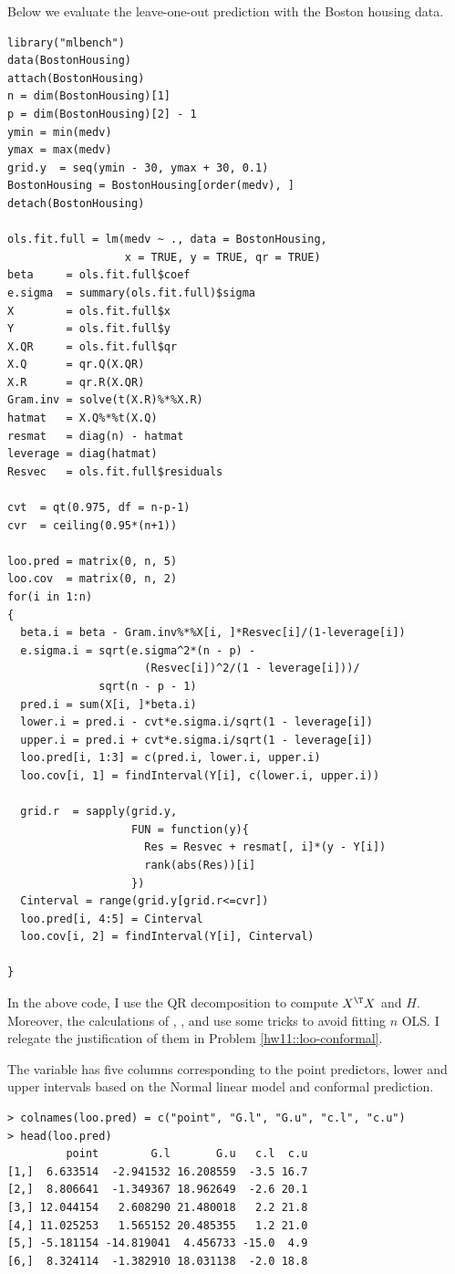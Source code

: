 Below we evaluate the leave-one-out prediction with the Boston housing data. 
\begin{lstlisting}
library("mlbench")
data(BostonHousing)
attach(BostonHousing)
n = dim(BostonHousing)[1]
p = dim(BostonHousing)[2] - 1
ymin = min(medv)
ymax = max(medv)
grid.y  = seq(ymin - 30, ymax + 30, 0.1)
BostonHousing = BostonHousing[order(medv), ]
detach(BostonHousing)

ols.fit.full = lm(medv ~ ., data = BostonHousing,
                  x = TRUE, y = TRUE, qr = TRUE)
beta     = ols.fit.full$coef
e.sigma  = summary(ols.fit.full)$sigma
X        = ols.fit.full$x
Y        = ols.fit.full$y
X.QR     = ols.fit.full$qr
X.Q      = qr.Q(X.QR)
X.R      = qr.R(X.QR)
Gram.inv = solve(t(X.R)%*%X.R)
hatmat   = X.Q%*%t(X.Q) 
resmat   = diag(n) - hatmat
leverage = diag(hatmat)
Resvec   = ols.fit.full$residuals

cvt  = qt(0.975, df = n-p-1)
cvr  = ceiling(0.95*(n+1))

loo.pred = matrix(0, n, 5)
loo.cov  = matrix(0, n, 2)
for(i in 1:n)
{
  beta.i = beta - Gram.inv%*%X[i, ]*Resvec[i]/(1-leverage[i])
  e.sigma.i = sqrt(e.sigma^2*(n - p) - 
                     (Resvec[i])^2/(1 - leverage[i]))/
              sqrt(n - p - 1)
  pred.i = sum(X[i, ]*beta.i) 
  lower.i = pred.i - cvt*e.sigma.i/sqrt(1 - leverage[i])
  upper.i = pred.i + cvt*e.sigma.i/sqrt(1 - leverage[i])
  loo.pred[i, 1:3] = c(pred.i, lower.i, upper.i)
  loo.cov[i, 1] = findInterval(Y[i], c(lower.i, upper.i))
  
  grid.r  = sapply(grid.y,
                   FUN = function(y){
                     Res = Resvec + resmat[, i]*(y - Y[i]) 
                     rank(abs(Res))[i]
                   })
  Cinterval = range(grid.y[grid.r<=cvr])
  loo.pred[i, 4:5] = Cinterval
  loo.cov[i, 2] = findInterval(Y[i], Cinterval)
  
}
\end{lstlisting}

In the above code, I use the QR decomposition to compute $X^{\T} X$ and $H$. Moreover, the calculations of , , and  use some tricks to avoid fitting $n$ OLS. I relegate the justification of them in Problem \ref{hw11::loo-conformal}. 

The variable  has five columns corresponding to the point predictors, lower and upper intervals based on the Normal linear model and conformal prediction. 
\begin{lstlisting}
> colnames(loo.pred) = c("point", "G.l", "G.u", "c.l", "c.u")
> head(loo.pred)
         point        G.l       G.u   c.l  c.u
[1,]  6.633514  -2.941532 16.208559  -3.5 16.7
[2,]  8.806641  -1.349367 18.962649  -2.6 20.1
[3,] 12.044154   2.608290 21.480018   2.2 21.8
[4,] 11.025253   1.565152 20.485355   1.2 21.0
[5,] -5.181154 -14.819041  4.456733 -15.0  4.9
[6,]  8.324114  -1.382910 18.031138  -2.0 18.8
\end{lstlisting}

